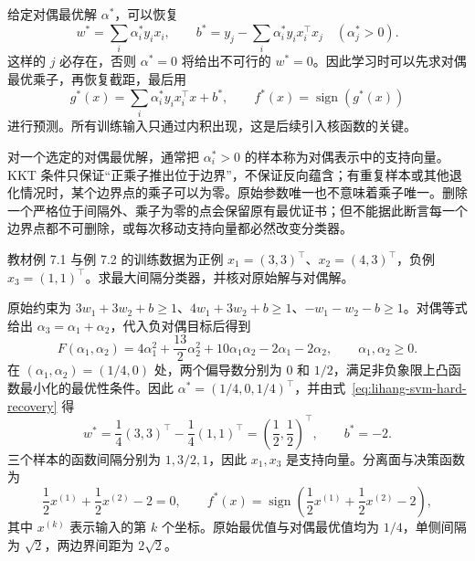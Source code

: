 给定对偶最优解 $\alpha^*$，可以恢复
\begin{equation}
  w^*=\sum_i\alpha_i^*y_i x_i,
  \qquad
  b^*=y_j-\sum_i\alpha_i^*y_i x_i^\top x_j
       \quad(\alpha_j^*>0).
  \label{eq:lihang-svm-hard-recovery}
\end{equation}
这样的 $j$ 必存在，否则 $\alpha^*=0$ 将给出不可行的 $w^*=0$。因此学习时可以先求对偶最优乘子，再恢复截距，最后用
\begin{equation}
  g^*(x)=\sum_i\alpha_i^*y_i x_i^\top x+b^*,
  \qquad f^*(x)=\operatorname{sign}(g^*(x))
  \label{eq:lihang-svm-hard-prediction}
\end{equation}
进行预测。所有训练输入只通过内积出现，这是后续引入核函数的关键。

\begin{notealert}[type=caution,title={边界点与正乘子不能无条件等同}]
对一个选定的对偶最优解，通常把 $\alpha_i^*>0$ 的样本称为对偶表示中的支持向量。KKT 条件只保证“正乘子推出位于边界”，不保证反向蕴含；有重复样本或其他退化情况时，某个边界点的乘子可以为零。原始参数唯一也不意味着乘子唯一。删除一个严格位于间隔外、乘子为零的点会保留原有最优证书；但不能据此断言每一个边界点都不可删除，或每次移动支持向量都必然改变分类器。
\end{notealert}

\begin{example}
\label{ex:lihang-svm-three-points}
教材例 7.1 与例 7.2 的训练数据为正例 $x_1=(3,3)^\top$、$x_2=(4,3)^\top$，负例 $x_3=(1,1)^\top$。求最大间隔分类器，并核对原始解与对偶解。
\end{example}
\begin{solve}
原始约束为 $3w_1+3w_2+b\ge1$、$4w_1+3w_2+b\ge1$、$-w_1-w_2-b\ge1$。对偶等式给出 $\alpha_3=\alpha_1+\alpha_2$，代入负对偶目标后得到
\[
  F(\alpha_1,\alpha_2)
    =4\alpha_1^2+\frac{13}{2}\alpha_2^2
      +10\alpha_1\alpha_2-2\alpha_1-2\alpha_2,
  \qquad \alpha_1,\alpha_2\ge0.
\]
在 $(\alpha_1,\alpha_2)=(1/4,0)$ 处，两个偏导数分别为 $0$ 和 $1/2$，满足非负象限上凸函数最小化的最优性条件。因此 $\alpha^*=(1/4,0,1/4)^\top$，并由式~\eqref{eq:lihang-svm-hard-recovery} 得
\[
  w^*=\frac14(3,3)^\top-\frac14(1,1)^\top
      =\left(\frac12,\frac12\right)^\top,
  \qquad b^*=-2.
\]
三个样本的函数间隔分别为 $1,3/2,1$，因此 $x_1,x_3$ 是支持向量。分离面与决策函数为
\[
  \frac12x^{(1)}+\frac12x^{(2)}-2=0,
  \qquad
  f^*(x)=\operatorname{sign}\left(\frac12x^{(1)}+\frac12x^{(2)}-2\right),
\]
其中 $x^{(k)}$ 表示输入的第 $k$ 个坐标。原始最优值与对偶最优值均为 $1/4$，单侧间隔为 $\sqrt2$，两边界间距为 $2\sqrt2$。
\end{solve}

